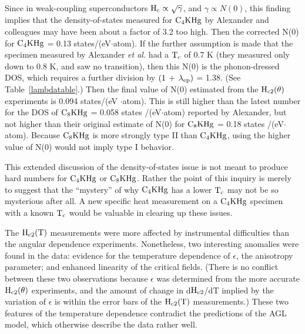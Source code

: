         Since    in   weak-coupling  superconductors    $\rm   H_c  \propto
\sqrt{\gamma}$,\cite{tinkham80} and $\gamma \propto N(0)$, this finding implies that the 
density-of-states measured for $\rm C_4KHg$ by Alexander and colleagues may
have been about a factor of 3.2 too high.  Then the corrected N(0) for $\rm
C_4KHg$  = 0.13 states/(eV$\cdot$atom).  If the  further assumption is made
that the specimen measured by Alexander {\em et al.\/} had  a  $\rm T_c$ of
0.7 K (they measured only down to 0.8 K,  and saw no transition), then this
N(0) is the phonon-dressed DOS, which requires a further division by $\rm (1 \,
+ \,
\lambda_{ep})$ = 1.38.  (See  Table~\ref{lambdatable}.)  Then the final value of
N(0)   estimated  from  the $\rm    H_{c2}(\theta)$  experiments   is 0.094
states/(eV $\cdot$atom).  This  is still higher than the  latest number for the
DOS of $\rm C_8KHg$ = 0.058 states /(eV$\cdot$atom) reported by Alexander,\cite{alexander81} but not higher
 than their  original estimate of N(0)  for $\rm C_8KHg$ = 0.18  states
/(eV$\cdot$atom).\cite{alexander80} Because $\rm C_8KHg$ is more  strongly type
II than $\rm C_4KHg$,\cite{iye82} using the higher  value of N(0) would  not 
imply type I behavior.

        This  extended discussion  of the  density-of-states  issue is  not
meant to produce hard numbers for $\rm C_4KHg$ or $\rm C_8KHg$.  Rather the
point of this inquiry is merely to suggest that the ``mystery'' of why $\rm
C_4KHg$ has a lower  $\rm T_c$ may  not be  so mysterious after all.  A new
specific heat measurement on a $\rm C_4KHg$ specimen with a known $\rm T_c$
would be valuable in clearing up these issues.

        The $\rm H_{c2}(T)$ measurements were more affected by instrumental
difficulties than   the angular dependence experiments.   Nonetheless,  two
interesting anomalies were found in the  data: evidence for the temperature
dependence of $\epsilon$, the  anisotropy parameter; and enhanced linearity
of   the  critical  fields.   (There  is  no   conflict   between these two
observations because $\epsilon$ was determined from  the more accurate $\rm
H_{c2}(\theta)$ experiments, and  the amount of  change in d$\rm H_{c2}$/dT
implied by the variation of $\epsilon$ is within the error bars of the $\rm
H_{c2}(T)$ measurements.)  These two features of the temperature dependence
contradict the predictions of  the  AGL model, which otherwise describe the
data rather well.

